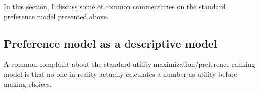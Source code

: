 In this section, I discuss some of common commentaries on the standard preference model presented above.

\subsection{Preference model as a descriptive model}

A common complaint about the standard utility maximization/preference ranking model is that no one in reality actually calculates a number as utility before making choices.
